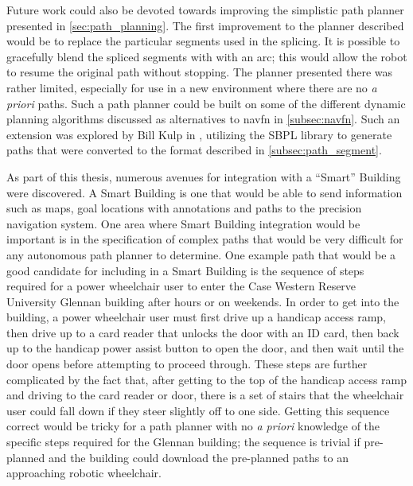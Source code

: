 Future work could also be devoted towards improving the simplistic path planner presented in \autoref{sec:path_planning}. The first improvement to the planner described would be to replace the particular segments used in the splicing. It is possible to gracefully blend the spliced segments with with an arc; this would allow the robot to resume the original path without stopping. The planner presented there was rather limited, especially for use in a new environment where there are no \emph{a priori} paths. Such a path planner could be built on some of the different dynamic planning algorithms discussed as alternatives to navfn in \autoref{subsec:navfn}. Such an extension was explored by Bill Kulp in \autocite{Kulp2012}, utilizing the SBPL library \autocite{Likhachev2010} to generate paths that were converted to the format described in \autoref{subsec:path_segment}.

As part of this thesis, numerous avenues for integration with a ``Smart'' Building were discovered. A Smart Building is one that would be able to send information such as maps, goal locations with annotations and paths to the precision navigation system. One area where Smart Building integration would be important is in the specification of complex paths that would be very difficult for any autonomous path planner to determine. One example path that would be a good candidate for including in a Smart Building is the sequence of steps required for a power wheelchair user to enter the Case Western Reserve University Glennan building after hours or on weekends. In order to get into the building, a power wheelchair user must first drive up a handicap access ramp, then drive up to a card reader that unlocks the door with an ID card, then back up to the handicap power assist button to open the door, and then wait until the door opens before attempting to proceed through. These steps are further complicated by the fact that, after getting to the top of the handicap access ramp and driving to the card reader or door, there is a set of stairs that the wheelchair user could fall down if they steer slightly off to one side. Getting this sequence correct would be tricky for a path planner with no \emph{a priori} knowledge of the specific steps required for the Glennan building; the sequence is trivial if pre-planned and the building could download the pre-planned paths to an approaching robotic wheelchair.

\begin{comment}

Details possible areas to expand on this thesis and improve its performance on our wheelchair platform

Talk about things where a Smart Building can \emph{definitely} help the precision navigation out. Some are obvious such as goal annotation so that things like ``kitchen'' mean something, but others are less obvious.

One of those would be things that would be tricky, even for a good path planner, such as the approach to get into Glennan from the quad-level.

\end{comment}